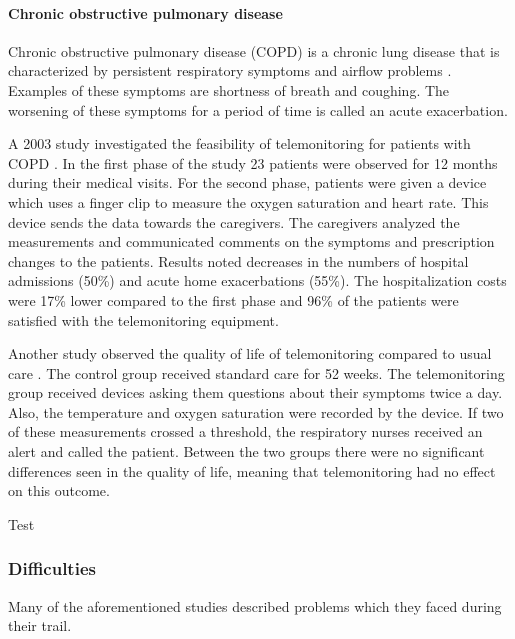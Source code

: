         \paragraph{Chronic obstructive pulmonary disease} Chronic obstructive pulmonary disease (COPD) is a chronic lung disease that is characterized by persistent respiratory symptoms and airflow problems \cite{vogelmeier2017global}. Examples of these symptoms are shortness of breath and coughing. The worsening of these symptoms for a period of time is called an acute exacerbation.

        A 2003 study investigated the feasibility of telemonitoring for patients with COPD \cite{maiolo2003home}. In the first phase of the study 23 patients were observed for 12 months during their medical visits. For the second phase, patients were given a device which uses a finger clip to measure the oxygen saturation and heart rate. This device sends the data towards the caregivers. The caregivers analyzed the measurements and communicated comments on the symptoms and prescription changes to the patients. Results noted decreases in the numbers of hospital admissions (50\%) and acute home exacerbations (55\%). The hospitalization costs were 17\% lower compared to the first phase and 96\% of the patients were satisfied with the telemonitoring equipment.

        Another study observed the quality of life of telemonitoring compared to usual care \cite{lewis2010home}. The control group received standard care for 52 weeks. The telemonitoring group received devices asking them questions about their symptoms twice a day. Also, the temperature and oxygen saturation were recorded by the device. If two of these measurements crossed a threshold, the respiratory nurses received an alert and called the patient. Between the two groups there were no significant differences seen in the quality of life, meaning that telemonitoring had no effect on this outcome.




        \noindent Test


        \subsubsection{Difficulties}

        Many of the aforementioned studies described problems which they faced during their trail.

